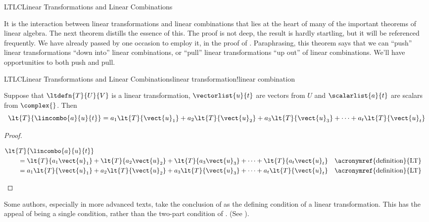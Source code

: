 \begin{subsect}{LTLC}{Linear Transformations and Linear Combinations}
%
\begin{para}It is the interaction between linear transformations and linear combinations that lies at the heart of many of the important theorems of linear algebra.  The next theorem distills the essence of this.  The proof is not deep, the result is hardly startling, but it will be referenced frequently.  We have already passed by one occasion to employ it, in the proof of .  Paraphrasing, this theorem says that we can ``push'' linear transformations ``down into'' linear combinations, or ``pull'' linear transformations ``up out'' of linear combinations.  We'll have opportunities to both push and pull.\end{para}
%
\begin{theorem}{LTLC}{Linear Transformations and Linear Combinations}{linear transformation!linear combination}
\begin{para}Suppose that $\ltdefn{T}{U}{V}$ is a linear transformation, $\vectorlist{u}{t}$ are vectors from $U$ and $\scalarlist{a}{t}$ are scalars from $\complex{\null}$.  Then
%
\begin{equation*}
\lt{T}{\lincombo{a}{u}{t}}
=
a_1\lt{T}{\vect{u}_1}+
a_2\lt{T}{\vect{u}_2}+
a_3\lt{T}{\vect{u}_3}+\cdots+
a_t\lt{T}{\vect{u}_t}
\end{equation*}
\end{para}
%
\end{theorem}
%
\begin{proof}
%
\begin{para}
\begin{align*}
&\lt{T}{\lincombo{a}{u}{t}}\\
&\quad\quad=
\lt{T}{a_1\vect{u}_1}+
\lt{T}{a_2\vect{u}_2}+
\lt{T}{a_3\vect{u}_3}+\cdots+
\lt{T}{a_t\vect{u}_t}&&\text{\acronymref{definition}{LT}}\\
&\quad\quad=
a_1\lt{T}{\vect{u}_1}+
a_2\lt{T}{\vect{u}_2}+
a_3\lt{T}{\vect{u}_3}+\cdots+
a_t\lt{T}{\vect{u}_t}&&\text{\acronymref{definition}{LT}}
\end{align*}
\end{para}
%
\end{proof}
%
\begin{para}Some authors, especially in more advanced texts, take the conclusion of  as the defining condition of a linear transformation.  This has the appeal of being a single condition, rather than the two-part condition of .  (See ).\end{para}

\end{subsect}
